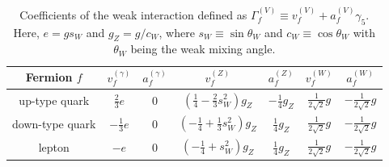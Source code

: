 \documentclass[12pt, a4paper]{article}
\begin{document}
\begin{table}[t]
  \centering
  \def\arraystretch{1.2}
  \begin{tabular}{c|cccccc}
    Fermion $f$ & $v_f^{(\gamma)}$ & $a_f^{(\gamma)}$ & $v_f^{(Z)}$ & $a_f^{(Z)}$ & $v_f^{(W)}$ & $a_f^{(W)}$ \\ \hline
    up-type quark & $\frac{2}{3}e$ & 0 & $(\frac{1}{4}-\frac{2}{3}s_W^2) g_Z$ & $-\frac{1}{4}g_Z$ & $\frac{1}{2\sqrt{2}}g$ & $-\frac{1}{2\sqrt{2}}g$ \\
    down-type quark & $-\frac{1}{3}e$ & 0 & $(-\frac{1}{4}+\frac{1}{3}s_W^2)g_Z$ & $\frac{1}{4}g_Z$ & $\frac{1}{2\sqrt{2}}g$ & $-\frac{1}{2\sqrt{2}}g$ \\
    lepton & $-e$ & 0 & $(-\frac{1}{4}+s_W^2)g_Z$ & $\frac{1}{4}g_Z$ & $\frac{1}{2\sqrt{2}}g$ & $-\frac{1}{2\sqrt{2}}g$ \\
  \end{tabular}
  \caption{Coefficients of the weak interaction defined as
    $\Gamma_f^{(V)} \equiv v_f^{(V)} + a_f^{(V)} \gamma_5$.  Here, $e = g
    s_W$ and $g_Z = g / c_W$, where $s_W \equiv \sin \theta_W$ and $c_W
    \equiv \cos \theta_W$ with $\theta_W$ being the weak mixing angle.}
  \label{table_weak}
\end{table}
\end{document}
